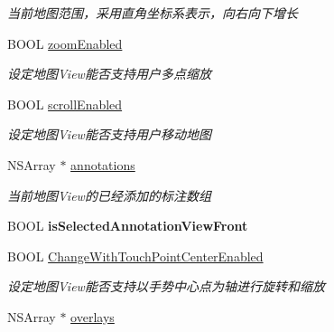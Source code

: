 \begin{DoxyCompactItemize}
\begin{DoxyCompactList}\small\item\em 当前地图范围，采用直角坐标系表示，向右向下增长 \end{DoxyCompactList}\item 
\hypertarget{interface_b_m_k_map_view_acf8472da994b76cef21a40673a41f774}{B\-O\-O\-L \hyperlink{interface_b_m_k_map_view_acf8472da994b76cef21a40673a41f774}{zoom\-Enabled}}\label{interface_b_m_k_map_view_acf8472da994b76cef21a40673a41f774}

\begin{DoxyCompactList}\small\item\em 设定地图\-View能否支持用户多点缩放 \end{DoxyCompactList}\item 
\hypertarget{interface_b_m_k_map_view_adc7ae3120b0edf096ac0eb42f13ed93a}{B\-O\-O\-L \hyperlink{interface_b_m_k_map_view_adc7ae3120b0edf096ac0eb42f13ed93a}{scroll\-Enabled}}\label{interface_b_m_k_map_view_adc7ae3120b0edf096ac0eb42f13ed93a}

\begin{DoxyCompactList}\small\item\em 设定地图\-View能否支持用户移动地图 \end{DoxyCompactList}\item 
\hypertarget{interface_b_m_k_map_view_a4d6a0d91974378d36f8da982e3eb85e8}{N\-S\-Array $\ast$ \hyperlink{interface_b_m_k_map_view_a4d6a0d91974378d36f8da982e3eb85e8}{annotations}}\label{interface_b_m_k_map_view_a4d6a0d91974378d36f8da982e3eb85e8}

\begin{DoxyCompactList}\small\item\em 当前地图\-View的已经添加的标注数组 \end{DoxyCompactList}\item 
\hypertarget{interface_b_m_k_map_view_acb3171d7647e36a9323e59f860e617a9}{B\-O\-O\-L {\bfseries is\-Selected\-Annotation\-View\-Front}}\label{interface_b_m_k_map_view_acb3171d7647e36a9323e59f860e617a9}

\item 
\hypertarget{interface_b_m_k_map_view_aa1868ea167edc68fe4b15ad982968ade}{B\-O\-O\-L \hyperlink{interface_b_m_k_map_view_aa1868ea167edc68fe4b15ad982968ade}{Change\-With\-Touch\-Point\-Center\-Enabled}}\label{interface_b_m_k_map_view_aa1868ea167edc68fe4b15ad982968ade}

\begin{DoxyCompactList}\small\item\em 设定地图\-View能否支持以手势中心点为轴进行旋转和缩放 \end{DoxyCompactList}\item 
\hypertarget{interface_b_m_k_map_view_a6c673c46ad9f146f80e48d82ebcf934b}{N\-S\-Array $\ast$ \hyperlink{interface_b_m_k_map_view_a6c673c46ad9f146f80e48d82ebcf934b}{overlays}}\label{interface_b_m_k_map_view_a6c673c46ad9f146f80e48d82ebcf934b}


\end{DoxyCompactItemize}
